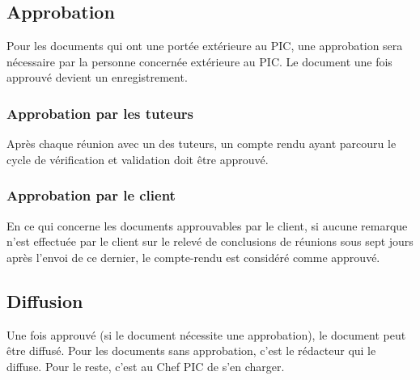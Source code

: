 \subsection{Approbation}
\label{Approbation}

Pour les documents qui ont une portée extérieure au PIC, une approbation sera nécessaire par la personne concernée extérieure au PIC. Le document une fois approuvé devient un enregistrement.

\subsubsection*{Approbation par les tuteurs}
Après chaque réunion avec un des tuteurs, un compte rendu ayant parcouru le cycle de
vérification et validation doit être approuvé.


\subsubsection*{Approbation par le client}
En ce qui concerne les documents approuvables par le client, si aucune remarque n'est effectuée
par le client sur le relevé de conclusions de réunions sous sept jours après l'envoi de ce dernier,
le compte-rendu est considéré comme approuvé.

\subsection{Diffusion}
\label{Diffusion}

Une fois approuvé (si le document nécessite une approbation), le document peut être diffusé.
Pour les documents sans approbation, c'est le rédacteur qui le diffuse. Pour le reste, c'est au
Chef PIC de s'en charger.
